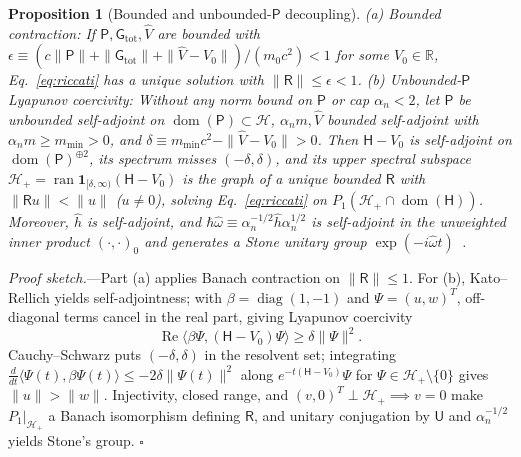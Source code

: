 \documentclass[aps,prl,reprint,superscriptaddress,nofootinbib,floatfix]{revtex4-2}
\theoremstyle{prlthm}
\newtheorem{proposition}{Proposition}
\begin{document}
\begin{proposition}[Bounded and unbounded-$\mathsf{P}$ decoupling]\label{prop:decoupling}
(a) \emph{Bounded contraction:} If $\mathsf{P},\mathsf{G}_{\mathrm{tot}},\hat{V}$ are bounded with $\epsilon\equiv(c\|\mathsf{P}\|+\|\mathsf{G}_{\mathrm{tot}}\|+\|\hat{V}-V_0\|)/(m_0c^2)<1$ for some $V_0\in\mathbb{R}$, Eq.~\eqref{eq:riccati} has a unique solution with $\|\mathsf{R}\|\le\epsilon<1$.
(b) \emph{Unbounded-$\mathsf{P}$ Lyapunov coercivity:} Without any norm bound on $\mathsf{P}$ or cap $\alpha_n<2$, let $\mathsf{P}$ be unbounded self-adjoint on $\operatorname{dom}(\mathsf{P})\subset\mathcal{H}$, $\alpha_n m,\hat{V}$ bounded self-adjoint with $\alpha_n m\ge m_{\min}>0$, and $\delta\equiv m_{\min}c^2-\|\hat{V}-V_0\|>0$. Then $\mathsf{H}-V_0$ is self-adjoint on $\operatorname{dom}(\mathsf{P})^{\oplus 2}$, its spectrum misses $(-\delta,\delta)$, and its upper spectral subspace $\mathcal{H}_+=\operatorname{ran}\mathbf{1}_{[\delta,\infty)}(\mathsf{H}-V_0)$ is the graph of a unique bounded $\mathsf{R}$ with $\|\mathsf{R}u\|<\|u\|$ ($u\neq 0$), solving Eq.~\eqref{eq:riccati} on $P_1(\mathcal{H}_+\cap\operatorname{dom}(\mathsf{H}))$. Moreover, $\hat{h}$ is self-adjoint, and $\hbar\hat{\omega}\equiv\alpha_n^{-1/2}\hat{h}\alpha_n^{1/2}$ is self-adjoint in the unweighted inner product $(\cdot,\cdot)_0$ and generates a Stone unitary group $\exp(-i\hat{\omega}t)$~\citep{Stone1932}.
\end{proposition}
\emph{Proof sketch.}---Part (a) applies Banach contraction on $\|\mathsf{R}\|\le 1$. For (b), Kato--Rellich yields self-adjointness; with $\beta=\operatorname{diag}(1,-1)$ and $\Psi=(u,w)^T$, off-diagonal terms cancel in the real part, giving Lyapunov coercivity
\begin{equation}
  \operatorname{Re}\langle\beta\Psi,(\mathsf{H}-V_0)\Psi\rangle\ge\delta\|\Psi\|^2.
  \label{eq:lyapunov}
\end{equation}
Cauchy--Schwarz puts $(-\delta,\delta)$ in the resolvent set; integrating $\frac{d}{dt}\langle\Psi(t),\beta\Psi(t)\rangle\le-2\delta\|\Psi(t)\|^2$ along $e^{-t(\mathsf{H}-V_0)}\Psi$ for $\Psi\in\mathcal{H}_+\setminus\{0\}$ gives $\|u\|>\|w\|$. Injectivity, closed range, and $(v,0)^T\perp\mathcal{H}_+\implies v=0$ make $P_1|_{\mathcal{H}_+}$ a Banach isomorphism defining $\mathsf{R}$, and unitary conjugation by $\mathsf{U}$ and $\alpha_n^{-1/2}$ yields Stone's group. \hfill$\square$
\end{document}
